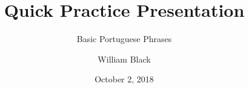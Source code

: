 \title{Quick Practice Presentation}
\subtitle{Basic Portuguese Phrases}
\author{William Black}
\date{October 2, 2018}